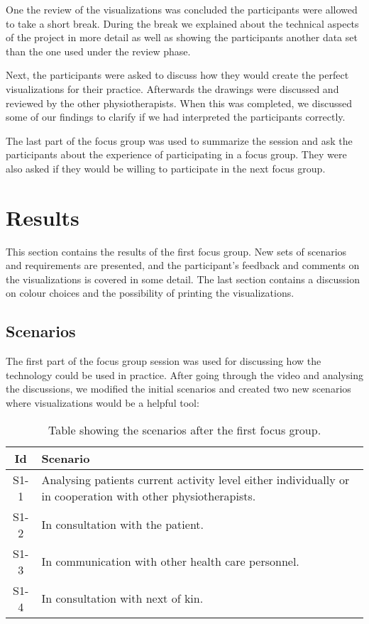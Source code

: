 One the review of the visualizations was concluded the participants were allowed to take a short break. During the break we explained about the technical aspects of the project in more detail as well as showing the participants another data set than the one used under the review phase. %

Next, the participants were asked to discuss how they would create the perfect visualizations for their practice. Afterwards the drawings were discussed and reviewed by the other physiotherapists. When this was completed, we discussed some of our findings to clarify if we had interpreted the participants correctly.

The last part of the focus group was used to summarize the session and ask the participants about the experience of participating in a focus group. They were also asked if they would be willing to participate in the next focus group.

\section{Results}
This section contains the results of the first focus group. New sets of scenarios and requirements are presented, and the participant's feedback and comments on the visualizations is covered in some detail. The last section contains a discussion on colour choices and the possibility of printing the visualizations.

\subsection{Scenarios}
The first part of the focus group session was used for discussing how the technology could be used in practice. After going through the video and analysing the discussions, we modified the initial scenarios and created two new scenarios where visualizations would be a helpful tool: 
\begin{table}[!h]
  \centering
  \begin{tabular}{|c|p{10cm}|}
    \hline
    \textbf{Id} & \textbf{Scenario} \\ \hline
    S1-1 & Analysing patients current activity level either individually or in cooperation with other physiotherapists. \\ \hline
    S1-2 & In consultation with the patient. \\ \hline
    S1-3 & In communication with other health care personnel. \\ \hline
    S1-4 & In consultation with next of kin. \\ \hline
  \end{tabular}
  \caption{Table showing the scenarios after the first focus group.}
\end{table}

